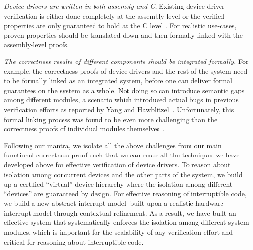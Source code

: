 {\em Device drivers are written in both assembly and C.}  Existing
device driver verification is either done completely at the assembly
level \cite{Alkassar:VSTTE08-225,duan2013} or the verified properties
are only guaranteed to hold at the C level \cite{Ryzhyk_09,Ryzhyk14}.
For realistic use-cases, proven properties should be 
translated down and then formally linked with
the assembly-level proofs.

%
{\em The correctness results of different components should be
integrated formally.} For example, the correctness proofs of device
drivers and the rest of the system
need to be formally linked as an integrated system,
before one can deliver formal guarantees on the system as a whole. Not
doing so can introduce semantic gaps among different modules,
a scenario which introduced actual bugs in previous verification
efforts as reported by Yang and Hawblitzel~\cite{hawblitzel10}. Unfortunately,
this formal linking process was found to be even more challenging than
the correctness proofs of individual modules
themselves~\cite{Alkassar:VSTTE08-225}. 

Following our mantra, we isolate all the above challenges from our main
functional correctness proof such that we can reuse all the techniques
we have developed above for effective verification of device drivers.
To reason about isolation among concurrent devices and the other parts
of the system, we build up a certified ``virtual'' device hierarchy where
the isolation among different ``devices'' are guaranteed by design.
For effective reasoning of interruptible code, we build a new abstract
interrupt model, built upon a realistic
hardware interrupt model through contextual refinement.
As a result, we have built an effective system that systematically enforces the
isolation among different system modules, which is important
for the scalability of any verification effort and critical for reasoning
about interruptible code. 


